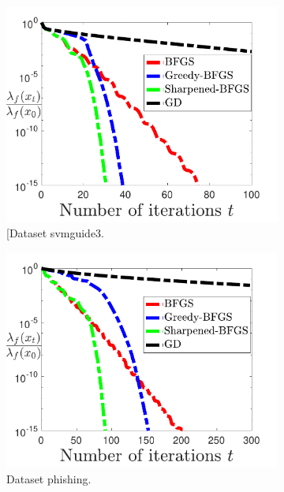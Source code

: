 \documentclass[11pt]{article}
\numberwithin{assumption}{section}
\numberwithin{remark}{section}
\numberwithin{theorem}{section}
\begin{document}
\begin{figure}
\centering
\begin{subfigure}{0.32\textwidth}
    \includegraphics[width=\textwidth]{Figures/svmguide3.pdf}
    \caption{[Dataset svmguide3.}
\end{subfigure}
\hfill
\begin{subfigure}{0.32\textwidth}
    \includegraphics[width=\textwidth]{Figures/phishing.pdf}
    \caption{Dataset phishing.}
\end{subfigure}
\hfill
\begin{subfigure}{0.32\textwidth}

\end{subfigure}
\end{figure}
\end{document}
